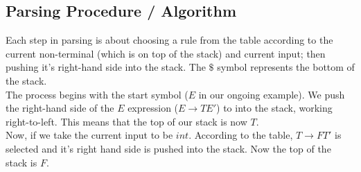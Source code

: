 
\subsection{Parsing Procedure / Algorithm}
Each step in parsing is about choosing a rule from the table according to the current non-terminal (which is on top of the stack) and current input; then pushing it's right-hand side into the stack. The $\$$ symbol represents the bottom of the stack. \\

The process begins with the start symbol ($E$ in our ongoing example). We push the right-hand side of the $E$ expression ($E \rightarrow TE'$) to into the stack, working right-to-left. This means that the top of our stack is now $T$.\\

Now, if we take the current input to be $int$. According to the table, $T \rightarrow FT'$ is selected and it's right hand side is pushed into the stack. Now the top of the stack is $F$.

